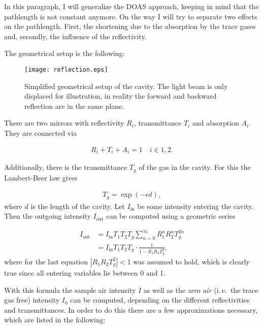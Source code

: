 In this paragraph, I will generalize the DOAS approach, keeping in mind
that the pathlength is not constant anymore. On the way I will try to
separate two effects on the pathlength. First, the shortening due to
the absorption by the trace gases and, secondly, the influence of the
reflectivity.

The geometrical setup is the following:

\begin{figure}[htbp]
  \centering
  \texttt{[image: reflection.eps]}
  \caption{Simplified geometrical setup of the cavity. The light beam
    is only displaced for illustration, in reality the forward and
    backward reflection are in the same plane.}
  \label{fig:cavity}
\end{figure}
There are two mirrors with reflectivity $R_i$, transmittance $T_i$
and absorption $A_i$. They are connected via

\begin{align*}
  R_i + T_i + A_i = 1 \quad i \in{1,2}.
\end{align*}

Additionally, there is the transmittance $T_g$ of the gas in the
cavity. For this the Lambert-Beer law gives

\begin{align*}
  T_g = \exp(-\epsilon d),
\end{align*}
where $d$ is the length of the cavity. Let $I_{\text{in}}$ be some
intensity entering the cavity. Then the outgoing intensity
$I_{\text{out}}$ can be computed using a geometric series

\begin{align}
  I_{\text{out}} & = I_{\text{in}} T_1 T_2 T_g \sum_{n=0}^\infty R_1^n R_2^n T_g^{2n}\nonumber\\
  & = I_{\text{in}} T_1 T_2 T_g \cdot \frac{1}{1 - R_1R_2T_g^2},\label{eq:geometric}
\end{align}
where for the last equation $|R_1R_2T_g^2| < 1$ was assumed to hold,
which is clearly true since all entering variables lie between 0 and
1.

With this formula the sample air intensity $I$ as well as the
\emph{zero air} (i.\,e.\ the trace gas free) intensity $I_0$ can be
computed, depending on the different reflectivities and
transmittances. In order to do this there are a few approximations
necessary, which are listed in the following:

